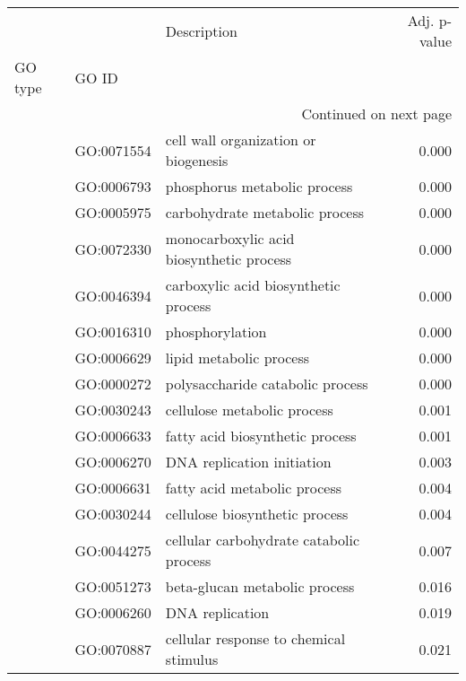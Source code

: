 \begin{longtable}{lllr}
\toprule
   &            &                                  Description &  Adj. p-value \\
GO type & GO ID &                                              &               \\
\midrule
\endhead
\midrule
\multicolumn{4}{r}{{Continued on next page}} \\
\midrule
\endfoot

\bottomrule
\endlastfoot
\multirow{31}{*}{BP} & GO:0071554 &         cell wall organization or biogenesis &         0.000 \\
   & GO:0006793 &                 phosphorus metabolic process &         0.000 \\
   & GO:0005975 &               carbohydrate metabolic process &         0.000 \\
   & GO:0072330 &     monocarboxylic acid biosynthetic process &         0.000 \\
   & GO:0046394 &         carboxylic acid biosynthetic process &         0.000 \\
   & GO:0016310 &                              phosphorylation &         0.000 \\
   & GO:0006629 &                      lipid metabolic process &         0.000 \\
   & GO:0000272 &             polysaccharide catabolic process &         0.000 \\
   & GO:0030243 &                  cellulose metabolic process &         0.001 \\
   & GO:0006633 &              fatty acid biosynthetic process &         0.001 \\
   & GO:0006270 &                   DNA replication initiation &         0.003 \\
   & GO:0006631 &                 fatty acid metabolic process &         0.004 \\
   & GO:0030244 &               cellulose biosynthetic process &         0.004 \\
   & GO:0044275 &      cellular carbohydrate catabolic process &         0.007 \\
   & GO:0051273 &                beta-glucan metabolic process &         0.016 \\
   & GO:0006260 &                              DNA replication &         0.019 \\
   & GO:0070887 &       cellular response to chemical stimulus &         0.021 \\

\end{longtable}
